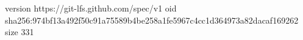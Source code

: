 version https://git-lfs.github.com/spec/v1
oid sha256:974bf13a492f50c91a75589b4be258a1fe5967c4cc1d364973a82dacaf169262
size 331
